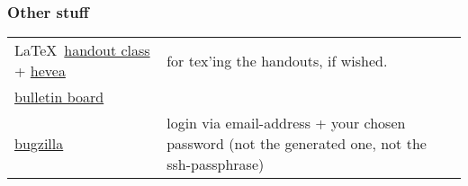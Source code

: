 \subsubsection*{Other stuff}

\begin{tabular}{lp{8cm}}
 \LaTeX\ \href{misc/handout.cls}{handout class}  +
 \href{misc/hevea.sty}{hevea} & for tex'ing the handouts, if wished.
 \\
 \href{http://snert.informatik.uni-kiel.de:8080/~swprakt/phpBB2/}{bulletin board}  
 \\
 \href{http://snert.informatik.uni-kiel.de:8080/~swprakt/bugzilla}{bugzilla} 
 &
 login via email-address + your chosen password (not the generated one, not the ssh-passphrase)
\end{tabular}





